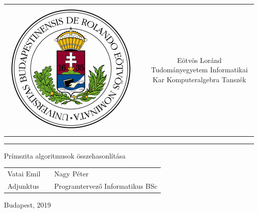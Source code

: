 \documentclass[12pt]{report}
\begin{document}
\begin{titlepage}
\vspace*{0cm}
\centering
\begin{tabular}{cp{2cm}c}
\begin{minipage}{4cm}
\vspace{0pt}
\includegraphics[width=1\textwidth]{eltecimerszines}
\end{minipage} & &
\begin{minipage}{7cm}
\vspace{0pt}Eötvös Loránd Tudományegyetem \vspace{10pt} \newline
Informatikai Kar \vspace{10pt} \newline
Komputeralgebra Tanszék
\end{minipage}
\end{tabular}

\vspace*{0.2cm}
\rule{\textwidth}{1pt}

\vspace*{6cm}
{\Huge Prímszita algoritmusok összehasonlítása}

\vspace*{5cm}
\begin{tabular}{lp{3cm}l}
Vatai Emil & & Nagy Péter\\
Adjunktus & & Programtervező Informatikus BSc
\end{tabular}

\vfill

\vspace*{1cm}
Budapest, 2019
\end{titlepage}
\end{document}
